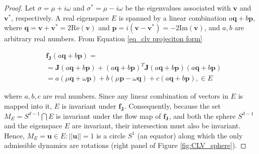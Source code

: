 \documentclass[10pt,a4paper]{amsart}
\begin{document}
\begin{proof}
Let $\sigma = \mu + i\omega$ and ${\sigma}^* = \mu - i\omega$ be the eigenvalues associated with $\mathbf{v}$ and ${\mathbf{v}^*}$, respectively. A real eigenspace $E$ is spanned by a linear combination $a\mathbf{q}+b\mathbf{p}$, where $\mathbf{q} = \mathbf{v} + \mathbf{v}^* = 2\mathrm{Re}(\mathbf{v})$ and $\mathbf{p} = i(\mathbf{v} - {\mathbf{v}}^*)=-2\mathrm{Im}(\mathbf{v})$, and $a,b$ are arbitrary real numbers.
From Equation \eqref{eq_clv projeciton form}

\begin{align}
&\mathbf{f_J}(a\mathbf{q} + b\mathbf{p}) = \nonumber \\ 
&=\mathbf{J} (a\mathbf{q} + b\mathbf{p}) +(a\mathbf{q}+ b\mathbf{p})^T\mathbf{J}(a\mathbf{q} + b\mathbf{p}) (a\mathbf{q} + b\mathbf{p})\nonumber \\ 
&= a(\mu \mathbf{q} + \omega\mathbf{p}) + b(\mu \mathbf{p} - \omega\mathbf{q}) + c(a\mathbf{q} + b\mathbf{p}) , \in E
\end{align}

where $a,b,c$ are real numbers. Since any linear combination of vectors in $E$ is mapped into it, $E$ is invariant under $\mathbf{f_J}$.
Consequently, because the set $M_E = S^{d-1} \bigcap E$ is invariant under the flow map of $\mathbf{f_J}$, and both the sphere $S^{d-1}$ and the eigenspace $E$ are invariant, their intersection must also be invariant.
Hence, $M_E = { \mathbf{u} \in E: ||\mathbf{u}|| = 1 }$ is a circle $S^1$ (an equator) along which the only admissible dynamics are rotations (right panel of Figure \ref{fig:CLV_sphere}).
\end{proof}
\end{document}
